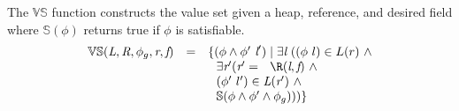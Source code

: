 \begin{definition}
\label{def:VS}
The $\mathbb{VS}$ function constructs the value set given a
heap, reference, and desired field where $\mathbb{S}(\phi)$ returns true if $\phi$ is satisfiable.
\[
\begin{array}{rcl}
  \mathbb{VS}(\cfgnt{L},\cfgnt{R},\phi_g,\cfgnt{r},\cfgnt{f}) & = &
  \{(\phi\wedge\phi^\prime\ \cfgnt{l}^\prime) \mid \exists
  \cfgnt{l}\ ((\phi\ l) \in L(r)\ \wedge \\ & &
  \ \ \exists \cfgnt{r}^\prime ( \cfgnt{r}^\prime =
  \ \ \R(\cfgnt{l},\cfgnt{f})\ \wedge \\ & & 
  \ \ (\phi^\prime\ l^\prime) \in \cfgnt{L}(\cfgnt{r}^\prime)\ \wedge \\ & &
  \ \ \mathbb{S}(\phi\wedge\phi^\prime\wedge \phi_g)))\}
\end{array}
\]
\end{definition}
